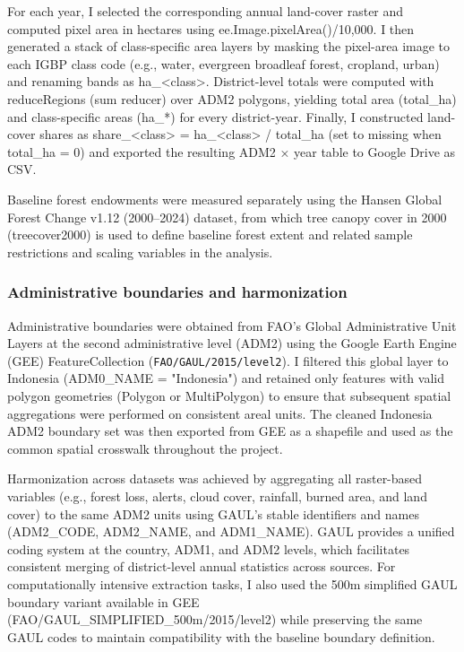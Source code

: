 \documentclass[hidelinks,12pt]{article}
\begin{document}
For each year, I selected the corresponding annual land-cover raster and computed pixel area in hectares using ee.Image.pixelArea()/10,000. I then generated a stack of class-specific area layers by masking the pixel-area image to each IGBP class code (e.g., water, evergreen broadleaf forest, cropland, urban) and renaming bands as ha\_<class>. District-level totals were computed with reduceRegions (sum reducer) over ADM2 polygons, yielding total area (total\_ha) and class-specific areas (ha\_*) for every district-year. Finally, I constructed land-cover shares as share\_<class> = ha\_<class> / total\_ha (set to missing when total\_ha = 0) and exported the resulting ADM2 × year table to Google Drive as CSV.

Baseline forest endowments were measured separately using the Hansen Global Forest Change v1.12 (2000–2024) dataset, from which tree canopy cover in 2000 (treecover2000) is used to define baseline forest extent and related sample restrictions and scaling variables in the analysis.


\subsubsection{Administrative boundaries and harmonization}

Administrative boundaries were obtained from FAO’s Global Administrative Unit Layers \citep{fao2015gaul_level2_gee} at the second administrative level (ADM2) using the Google Earth Engine (GEE) FeatureCollection (\nolinkurl{FAO/GAUL/2015/level2}). I filtered this global layer to Indonesia (ADM0\_NAME = "Indonesia") and retained only features with valid polygon geometries (Polygon or MultiPolygon) to ensure that subsequent spatial aggregations were performed on consistent areal units. The cleaned Indonesia ADM2 boundary set was then exported from GEE as a shapefile and used as the common spatial crosswalk throughout the project.

Harmonization across datasets was achieved by aggregating all raster-based variables (e.g., forest loss, alerts, cloud cover, rainfall, burned area, and land cover) to the same ADM2 units using GAUL’s stable identifiers and names (ADM2\_CODE, ADM2\_NAME, and ADM1\_NAME). GAUL provides a unified coding system at the country, ADM1, and ADM2 levels, which facilitates consistent merging of district-level annual statistics across sources. For computationally intensive extraction tasks, I also used the 500m simplified GAUL boundary variant available in GEE (FAO/GAUL\_SIMPLIFIED\_500m/2015/level2) while preserving the same GAUL codes to maintain compatibility with the baseline boundary definition.
\end{document}
